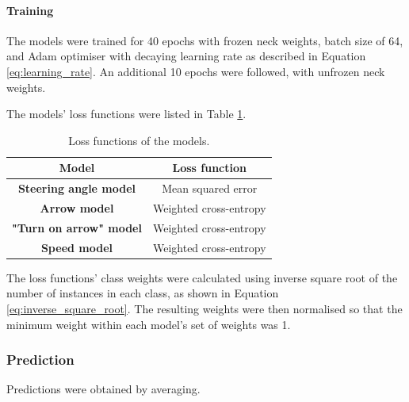 \documentclass{article}
\begin{document}
\paragraph{Training}
The models were trained for 40 epochs with frozen neck weights, batch size of 64, and Adam optimiser with decaying learning rate as described in Equation \ref{eq:learning_rate}. An additional 10 epochs were followed, with unfrozen neck weights. 

The models' loss functions were listed in Table \ref{tab:live_test_loss_functions}.

\begin{table}[H]
  \centering
  \begin{tabular}{|c|c|}
    \hline
    \textbf{Model} & \textbf{Loss function} \\ \hline
    \textbf{Steering angle model} & Mean squared error \\ \hline
    \textbf{Arrow model} & Weighted cross-entropy \\ \hline
    \textbf{"Turn on arrow" model} & Weighted cross-entropy \\ \hline
    \textbf{Speed model} & Weighted cross-entropy \\ \hline
  \end{tabular}
  \vspace{0.5em}
  \caption{Loss functions of the models.}
  \label{tab:live_test_loss_functions}
\end{table}

The loss functions' class weights were calculated using inverse square root of the number of instances in each class, as shown in Equation \ref{eq:inverse_square_root}. The resulting weights were then normalised so that the minimum weight within each model's set of weights was 1.

\subsubsection{Prediction}
Predictions were obtained by averaging.
\end{document}
